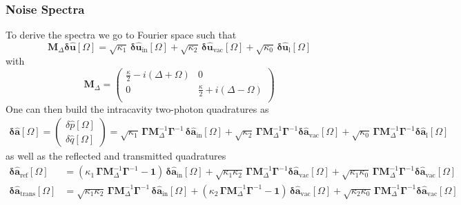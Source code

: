 \subsubsection{Noise Spectra} 
To derive the spectra we go to Fourier space such that 
\begin{equation}
     \mathbf{M}_\Delta \mathbf{\delta \hat{u}}[\Omega]  = \sqrt{\kappa_{\mathrm{1}}} \, \mathbf{\delta \hat{u}_{\mathrm{in}}}[\Omega]  + \sqrt{\kappa_2} \, \mathbf{\delta \hat{u}_{\mathrm{vac}}}[\Omega]   + \sqrt{\kappa_0} \, \mathbf{\delta \hat{u}_{\mathrm{l}}}[\Omega]   
\end{equation}
with 
\begin{equation}
  \mathbf{M}_\Delta =\begin{pmatrix}
  \frac{\kappa}{2}-i(\Delta+\Omega) & 0 \\ 
  0 & \frac{\kappa}{2}+i(\Delta-\Omega)\\ 
  \end{pmatrix} 
\end{equation}
One can then build the intracavity two-photon quadratures as 
\begin{equation}
  \begin{split}
  \mathbf{\delta \hat{a}}[\Omega]  = \begin{pmatrix}
  \delta \hat{p}[\Omega] \\[2pt]
\delta \hat{q}[\Omega]
\end{pmatrix}  = \sqrt{\kappa_1} \, \mathbf{\Gamma} \mathbf{M}^{-1}_\Delta \mathbf{\Gamma}^{-1}\, \mathbf{\delta \hat{a}_{\mathrm{in}}}[\Omega] +  \sqrt{\kappa_2} \,\mathbf{\Gamma}  \mathbf{M}^{-1}_\Delta \mathbf{\Gamma}^{-1} \mathbf{\delta \hat{a}_{\mathrm{vac}}}[\Omega] +  \sqrt{\kappa_0} \,\mathbf{\Gamma}  \mathbf{M}^{-1}_\Delta \mathbf{\Gamma}^{-1} \mathbf{\delta \hat{a}_{\mathrm{l}}}[\Omega] 
\end{split}
\end{equation}
as well as the reflected and transmitted quadratures 
\begin{equation}
  \begin{split}
  \mathbf{\delta \hat{a}_{\mathrm{ref}}}[\Omega]  &= ( \kappa_1 \, \mathbf{\Gamma} \mathbf{M}^{-1}_\Delta \mathbf{\Gamma}^{-1}- \mathbf{1} )\, \mathbf{\delta \hat{a}_{\mathrm{in}}}[\Omega] +  \sqrt{\kappa_1 \kappa_2} \,\mathbf{\Gamma}  \mathbf{M}^{-1}_\Delta \mathbf{\Gamma}^{-1} \mathbf{\delta \hat{a}_{\mathrm{vac}}}[\Omega] +  \sqrt{\kappa_1 \kappa_0} \,\mathbf{\Gamma}  \mathbf{M}^{-1}_\Delta \mathbf{\Gamma}^{-1} \mathbf{\delta \hat{a}_{\mathrm{vac}}}[\Omega]\\
  \mathbf{\delta \hat{a}_{\mathrm{trans}}}[\Omega] & = \sqrt{\kappa_1 \kappa_2} \, \mathbf{\Gamma} \mathbf{M}^{-1}_\Delta \mathbf{\Gamma}^{-1}\, \mathbf{\delta \hat{a}_{\mathrm{in}}}[\Omega] +  (\kappa_2 \,\mathbf{\Gamma}  \mathbf{M}^{-1}_\Delta \mathbf{\Gamma}^{-1}- \mathbf{1}) \, \mathbf{\delta \hat{a}_{\mathrm{vac}}}[\Omega] +  \sqrt{\kappa_2 \kappa_0} \,\mathbf{\Gamma}  \mathbf{M}^{-1}_\Delta \mathbf{\Gamma}^{-1} \mathbf{\delta \hat{a}_{\mathrm{vac}}}[\Omega]
  \end{split}
\end{equation}


